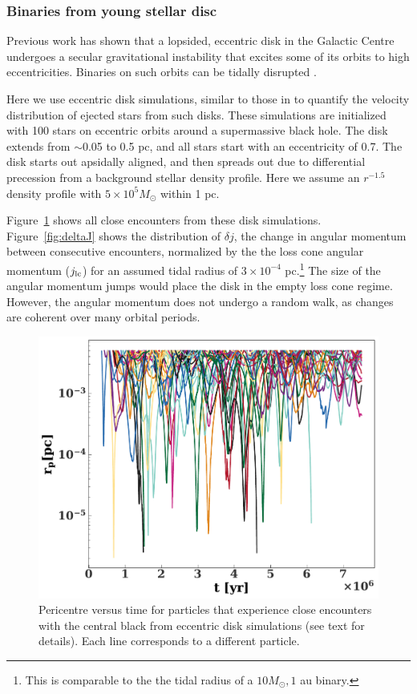\documentclass[fleqn,usenatbib]{mnras}
\begin{document}
\subsubsection{Binaries from young stellar disc}
    Previous work has shown that a lopsided, eccentric disk in the Galactic Centre undergoes a secular gravitational instability that excites some of its orbits to high eccentricities. Binaries on such orbits can be tidally disrupted \citep{madigan+2009, generozov&madigan2020}.
    
    
    Here we use eccentric disk simulations, similar to those in \citet{generozov&madigan2020} to quantify the velocity distribution of ejected stars from such disks. These simulations are initialized with 100 stars on eccentric orbits around a supermassive black hole. The disk extends from $\sim$0.05 to 0.5 pc, and all stars start with an eccentricity of 0.7. The disk starts out apsidally aligned, and then spreads out due to differential precession from a background stellar density profile. Here we assume an $r^{-1.5}$ density profile with $5\times 10^5 M_{\odot}$ within 1 pc.

    
    Figure~\ref{fig:encounters} shows all close encounters from these disk simulations.
    Figure~\ref{fig:deltaJ} shows the distribution of $\delta j$, the change in angular momentum between consecutive encounters, normalized by the the loss cone angular momentum ($j_{\rm lc}$) for an assumed tidal radius of $3\times 10^{-4}$ pc.\footnote{This is comparable to the the tidal radius of a $10 M_{\odot}, 1$ au binary.} The size of the angular momentum jumps would place the disk in the empty loss cone regime. However, the angular momentum does not undergo a random walk, as changes are coherent over many orbital periods.
    
    \begin{figure}
        \includegraphics[width=\columnwidth]{figures/close_encounters.pdf}
        \caption{Pericentre versus time for particles that experience close encounters with the central black from eccentric disk simulations (see text for details). Each line corresponds to a different particle.}
        \label{fig:encounters}
    \end{figure}
    
\end{document}
